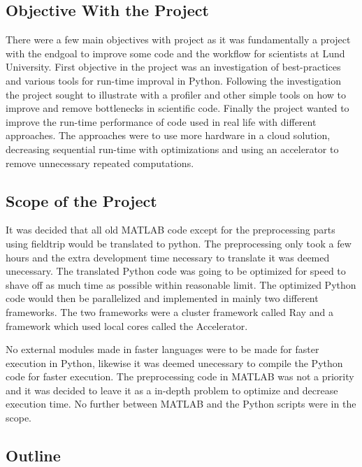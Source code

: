 \documentclass[12pt, a4paper]{article}
\begin{document}
\subsection{Objective With the Project}%

There were a few main objectives with project as it was fundamentally a project with the endgoal to improve some code and the workflow for scientists at Lund University.
First objective in the project was an investigation of best-practices and various tools for run-time improval in Python.
Following the investigation the project sought to illustrate with a profiler and other simple tools on how to improve and remove bottlenecks in scientific code.
Finally the project wanted to improve the run-time performance of code used in real life with different approaches.
The approaches were to use more hardware in a cloud solution, decreasing sequential run-time with optimizations and using an accelerator to remove unnecessary repeated computations.


\subsection{Scope of the Project}%

It was decided that all old MATLAB code except for the preprocessing parts using fieldtrip would be translated to python.
The preprocessing only took a few hours and the extra development time necessary to translate it was deemed unecessary. 
The translated Python code was going to be optimized for speed to shave off as much time as possible within reasonable limit.
The optimized Python code would then be parallelized and implemented in mainly two different frameworks.
The two frameworks were a cluster framework called Ray and a framework which used local cores called the Accelerator.

No external modules made in faster languages were to be made for faster execution in Python, likewise it was deemed unecessary to compile the Python code for faster execution.
The preprocessing code in MATLAB was not a priority and it was decided to leave it as a in-depth problem to optimize and decrease execution time.
No further between MATLAB and the Python scripts were in the scope.


\subsection{Outline}
\end{document}
